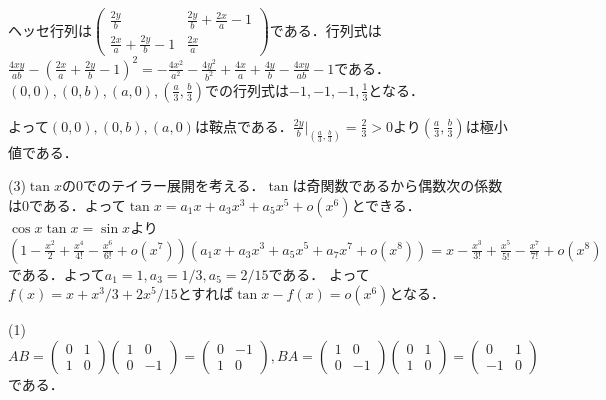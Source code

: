 \documentclass[
		book,
		head_space=20mm,
		foot_space=20mm,
		gutter=10mm,
		line_length=190mm
]{jlreq}
\begin{document}
    ヘッセ行列は$\begin{pmatrix}
        \frac{2y}{b} & \frac{2y}{b}+\frac{2x}{a}-1 \\
        \frac{2x}{a}+\frac{2y}{b}-1 & \frac{2x}{a}
    \end{pmatrix}$である．行列式は
    $\frac{4xy}{ab}-(\frac{2x}{a}+\frac{2y}{b}-1)^2=-\frac{4x^2}{a^2}-\frac{4y^2}{b^2}+\frac{4x}{a}+\frac{4y}{b}-\frac{4xy}{ab}-1$である．
    $(0,0),(0,b),(a,0),(\frac{a}{3},\frac{b}{3})$での行列式は$-1,-1,-1,\frac{1}{3}$となる．

    よって$(0,0),(0,b),(a,0)$は鞍点である．$\frac{2y}{b}|_{(\frac{a}{3},\frac{b}{3})}=\frac{2}{3}>0$より$(\frac{a}{3},\frac{b}{3})$は極小値である．

    (3)$\tan x$の$0$でのテイラー展開を考える．$\tan $は奇関数であるから偶数次の係数は$0$である．よって$\tan x=a_1 x+a_3x^3+a_5x^5+o(x^6)$とできる．$\cos x \tan x=\sin x$より
    $(1-\frac{x^2}{2}+\frac{x^4}{4!}-\frac{x^6}{6!}+o(x^7))(a_1 x+a_3x^3+a_5x^5+a_7x^7+o(x^8))=x-\frac{x^3}{3!}+\frac{x^5}{5!}-\frac{x^7}{7!}+o(x^8)$である．よって$a_1=1,a_3=1/3,a_5=2/15$である．
    よって$f(x)=x+x^3/3+2x^5/15$とすれば$\tan x -f(x) = o(x^6)$となる．

    (1)$AB=\begin{pmatrix}
        0 & 1\\
        1 & 0
    \end{pmatrix}\begin{pmatrix}
        1 & 0\\
        0 & -1
    \end{pmatrix}=\begin{pmatrix}
        0 & -1\\
        1 & 0
    \end{pmatrix},BA=\begin{pmatrix}
        1 & 0\\
        0 & -1
    \end{pmatrix}\begin{pmatrix}
        0 & 1\\
        1 & 0
    \end{pmatrix}=\begin{pmatrix}
        0 & 1\\
        -1 & 0
    \end{pmatrix}$である．
\end{document}

